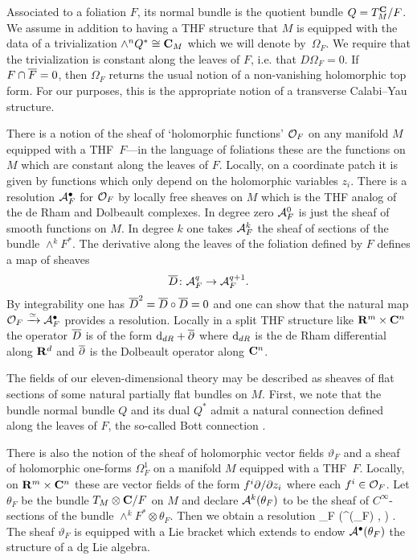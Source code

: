 Associated to a foliation $F$, its normal bundle is the quotient bundle $Q = T^{\C}_{M}/F$. We assume in addition to having a THF structure that $M$ is equipped with the data of a trivialization $\wedge^{n} Q^* \cong \C_{M}$ which we will denote by~$\Omega_F$. We require that the trivialization is constant along the leaves of $F$, i.e. that $D\Omega_{F} = 0$. If $F \cap \Bar{F} = 0$, then $\Omega_F$ returns the usual notion of a non-vanishing holomorphic top form. For our purposes, this is the appropriate notion of a transverse Calabi--Yau structure.

There is a notion of the sheaf of `holomorphic functions' $\cO_F$ on any manifold $M$ equipped with a THF~$F$---in the language of foliations these are the functions on $M$ which are constant along the leaves of $F$.
Locally, on a coordinate patch it is given by functions which only depend on the holomorphic variables $z_i$.
There is a resolution $\cA^\bu_F$ for $\cO_F$ by locally free sheaves on $M$ which is the THF analog of the de Rham and Dolbeault complexes. 
In degree zero $\cA^0_F$ is just the sheaf of smooth functions on $M$.
In degree $k$ one takes $\cA^k_F$ the sheaf of sections of the bundle $\wedge^k F^*$.
The derivative along the leaves of the foliation defined by $F$ defines a map of sheaves
\[
\thfd \colon \cA^{q}_F \to \cA^{q+1}_F  .
\]
By integrability one has $\thfd^2 = \thfd \circ \thfd = 0$ and one can show that the natural map $\cO_F \xto{\simeq} \cA^\bu_F$ provides a resolution.
Locally in a split THF structure like $\R^m \times \C^n$ the operator $\thfd$ is of the form $\d_{dR} + \dbar$ where $\d_{dR}$ is the de Rham differential along $\R^d$ and $\dbar$ is the Dolbeault operator along $\C^n$.


The fields of our eleven-dimensional theory may be described as sheaves of flat sections of some natural partially flat bundles on $M$. First, we note that the bundle normal bundle $Q$ and its dual $Q^{*}$ admit a natural connection defined along the leaves of $F$, the so-called Bott connection \cite{KamberTondeur}.

There is also the notion of the sheaf of holomorphic vector fields $\vartheta_F$ and a sheaf of holomorphic one-forms $\Omega^1_F$ on a manifold $M$ equipped with a THF~$F$.
Locally, on $\R^m \times \C^n$ these are vector fields of the form $f^i \del / \del z_i$ where each $f^i \in \cO_F$.
Let $\theta_F$ be the bundle $T_M \otimes \C / F$ on $M$ and declare 
$\cA^k(\theta_F)$ to be the sheaf of $C^\infty$-sections of the bundle $\wedge^k F^* \otimes \theta_F$.
Then we obtain a resolution
\beqn
\vartheta_F \xto{\simeq} \left(\cA^\bu(\theta_F) , \thfd \otimes \id\right) .
\eeqn
The sheaf $\vartheta_F$ is equipped with a Lie bracket which extends to endow $\cA^\bu(\theta_F)$ the structure of a dg Lie algebra.

